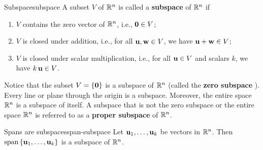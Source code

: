 \begin{definition}{Subspace}{subspace}
  A subset $V$ of\/ $\mathbb{R}^n$ is called a \textbf{subspace}%
   of\/ $\mathbb{R}^n$ if
  \begin{enumerate}
  \item $V$ contains the zero vector of\/ $\mathbb{R}^n$, i.e., $\mbox{\bf 0}\in V$;
  \item $V$ is closed under addition, i.e., for all\/
    $\mbox{\bf u},\mbox{\bf w}\in V$, we have $\mbox{\bf u}+\mbox{\bf w}\in V$;
  \item $V$ is closed under scalar multiplication, i.e., for all\/
    $\mbox{\bf u}\in V$ and scalars $k$, we have\/ $k\,\mbox{\bf u}\in V$.
  \end{enumerate}
\end{definition}

Notice that the subset $V = \left\{\mbox{\bf 0}\right\}$ is a subspace of\/ $\mathbb{R}^n$
(called the \textbf{zero subspace}%
). Every line or plane through the
origin is a subspace. Moreover, the entire space $\mathbb{R}^n$ is a subspace
of itself. A subspace that is not the zero subspace or the entire
space $\mathbb{R}^n$ is referred to as a \textbf{proper subspace}%
 of\/ $\mathbb{R}^n$.

\begin{proposition}{Spans are subspaces}{span-subspace}
  Let $\mbox{\bf u}_1,\ldots,\mbox{\bf u}_k$ be vectors in $\mathbb{R}^{n}$. Then
  $\sspan\set{\vect{u}_1,\ldots,\vect{u}_k}$ is a subspace of
  $\mathbb{R}^{n}$.%
\end{proposition}

